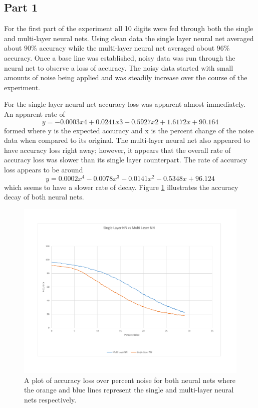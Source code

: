 \documentclass{IEEEtran}
\begin{document}
		\subsection{Part 1}
			For the first part of the experiment all 10 digits were fed through both the single and multi-layer neural nets. Using clean data the single layer neural net averaged about 90\% accuracy while the multi-layer neural net averaged about 96\% accuracy. Once a base line was established, noisy data was run through the neural net to observe a loss of accuracy. The noisy data started with small amounts of noise being applied and was steadily increase over the course of the experiment.
			
			For the single layer neural net accuracy loss was apparent almost immediately. An apparent rate of 
			\begin{equation*}
			y = -0.0003x4 + 0.0241x3 - 0.5927x2 + 1.6172x + 90.164
			\end{equation*}
			formed where y is the expected accuracy and x is the percent change of the noise data when compared to its original. The multi-layer neural net also appeared to have accuracy loss right away; however, it appears that the overall rate of accuracy loss was slower than its single layer counterpart. The rate of accuracy loss appears to be around
			\begin{equation*}
			y = 0.0002x^4 - 0.0078x^3 - 0.0141x^2 - 0.5348x + 96.124
			\end{equation*}
			which seems to have a slower rate of decay. Figure \ref{part1} illustrates the accuracy decay of both neural nets.
			
			\begin{figure}
				\centering
				\includegraphics[width=\linewidth]{SinglevsMulti.pdf}
				\caption{A plot of accuracy loss over percent noise for both neural nets where the orange and blue lines represent the single and multi-layer neural nets respectively.}
				\label{part1}
			\end{figure}
			
\end{document}
